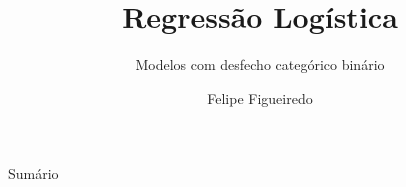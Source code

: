 \documentclass{beamer}
\title%
{Regressão Logística}
\subtitle
{Modelos com desfecho categórico binário} %
\author%
{Felipe Figueiredo}%
\institute[INTO] %
{Instituto Nacional de Traumatologia e Ortopedia
}
\date%
{}
\begin{document}
\begin{frame}
  \titlepage
\end{frame}

\begin{frame}{Sumário}
  \tableofcontents
\end{frame}








\end{document}
